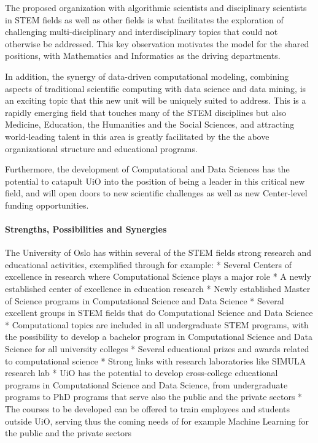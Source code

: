 \documentclass[]{article}
\let\oldparagraph\paragraph
\renewcommand{\paragraph}[1]{\oldparagraph{#1}\mbox{}}
\begin{document}
The proposed organization with algorithmic scientists and disciplinary
scientists in STEM fields as well as other fields is what facilitates
the exploration of challenging multi-disciplinary and interdisciplinary
topics that could not otherwise be addressed. This key observation
motivates the model for the shared positions, with Mathematics and
Informatics as the driving departments.

In addition, the synergy of data-driven computational modeling,
combining aspects of traditional scientific computing with data science
and data mining, is an exciting topic that this new unit will be
uniquely suited to address. This is a rapidly emerging field that
touches many of the STEM disciplines but also Medicine, Education, the
Humanities and the Social Sciences, and attracting world-leading talent
in this area is greatly facilitated by the the above organizational
structure and educational programs.

Furthermore, the development of Computational and Data Sciences has the
potential to catapult UiO into the position of being a leader in this
critical new field, and will open doors to new scientific challenges as
well as new Center-level funding opportunities.

\hypertarget{strengths-possibilities-and-synergies}{%
\paragraph{Strengths, Possibilities and
Synergies}\label{strengths-possibilities-and-synergies}}

The University of Oslo has within several of the STEM fields strong
research and educational activities, exemplified through for example: *
Several Centers of excellence in research where Computational Science
plays a major role * A newly established center of excellence in
education research * Newly established Master of Science programs in
Computational Science and Data Science * Several excellent groups in
STEM fields that do Computational Science and Data Science *
Computational topics are included in all undergraduate STEM programs,
with the possibility to develop a bachelor program in Computational
Science and Data Science for all university colleges * Several
educational prizes and awards related to computational science * Strong
links with research laboratories like SIMULA research lab * UiO has the
potential to develop cross-college educational programs in Computational
Science and Data Science, from undergraduate programs to PhD programs
that serve also the public and the private sectors * The courses to be
developed can be offered to train employees and students outside UiO,
serving thus the coming needs of for example Machine Learning for the
public and the private sectors
\end{document}
